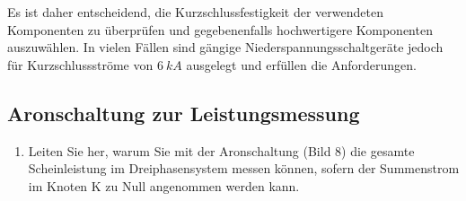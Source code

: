 \begin{enumerate}[label=\alph*)]
  Es ist daher entscheidend, die Kurzschlussfestigkeit der verwendeten Komponenten zu überprüfen und gegebenenfalls hochwertigere Komponenten auszuwählen. In vielen Fällen sind gängige Niederspannungsschaltgeräte jedoch für Kurzschlussströme von $6\ kA$ ausgelegt und erfüllen die Anforderungen.
\end{enumerate}
  
\subsection{Aronschaltung zur Leistungsmessung }
\begin{enumerate}[label=\alph*)]
  \item Leiten Sie her, warum Sie mit der Aronschaltung (Bild 8) die gesamte
        Scheinleistung im Dreiphasensystem messen können, sofern der Summenstrom im
        Knoten K zu Null angenommen werden kann.


\end{enumerate}
